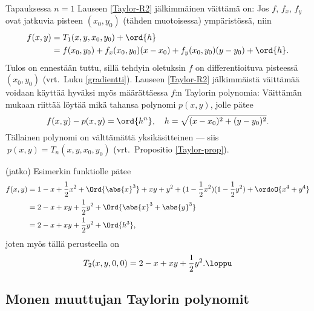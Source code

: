 Tapauksessa $n=1$ Lauseen \ref{Taylor-R2} jälkimmäinen väittämä on: Jos $f$, $f_x$,
$f_y$ ovat jatkuvia pisteen $(x_0,y_0)$ (tähden muotoisessa) ympäristössä, niin
\begin{align*}
f(x,y) &= T_1(x,y,x_0,y_0)+\ord{h} \\
&= f(x_0,y_0)+f_x(x_0,y_0)(x-x_0)+f_y(x_0,y_0)(y-y_0)+\ord{h}.
\end{align*}
Tulos on ennestään tuttu, sillä tehdyin oletuksin $f$ on differentioituva pisteessä $(x_0,y_0)$
(vrt.\ Luku \ref{gradientti}). Lauseen \ref{Taylor-R2} jälkimmäistä väittämää voidaan käyttää
hyväksi myös määrättäessa $f$:n Taylorin polynomia: Väittämän mukaan riittää löytää mikä
tahansa polynomi $p(x,y)$, jolle pätee
\[
f(x,y)-p(x,y)=\ord{h^{n}},\quad h=\sqrt{(x-x_0)^2+(y-y_0)^2}.
\]
Tällainen polynomi on välttämättä yksikäsitteinen --- siis $\ p(x,y)=T_n(x,y,x_0,y_0)$
(vrt.\ Propositio \ref{Taylor-prop}).
\jatko \begin{Exa} (jatko) Esimerkin funktiolle pätee
\begin{align*}
f(x,y)&=1-x+\frac{1}{2}x^2+\Ord{\abs{x}^3}+xy+y^2
                          +(1-\frac{1}{2}x^2)(1-\frac{1}{2}y^2)+\ordoO{x^4+y^4} \\
&= 2-x+xy+\frac{1}{2}y^2+\Ord{\abs{x}^3+\abs{y}^3} \\
&= 2-x+xy+\frac{1}{2}y^2+\Ord{h^3},
\end{align*}
joten myös tällä perusteella on
\[
T_2(x,y,0,0)=2-x+xy+\frac{1}{2}y^2. \loppu
\]
\end{Exa}

\subsection{Monen muuttujan Taylorin polynomit}

